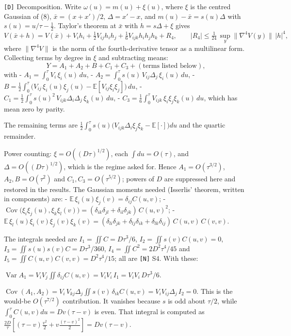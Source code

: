 \documentclass[11pt,a4paper]{article}
\begin{document}
\texttt{[D]} Decomposition. Write \(\omega(u)=m(u)+\xi(u)\), where \(\xi\) is the centred Gaussian of (8), \(\bar x=(x+x')/2\), \(\Delta=x'-x\), and \(m(u)-\bar x=s(u)\Delta\) with \(s(u)=u/\tau-\tfrac12\). Taylor's theorem at \(\bar x\) with \(h=s\Delta+\xi\) gives
\[V(\bar x+h)=V(\bar x)+V_ih_i+\tfrac12V_{ij}h_ih_j+\tfrac16V_{ijk}h_ih_jh_k+R_4,\qquad|R_4|\le\tfrac1{24}\,\sup_y\|\nabla^4V(y)\|\,|h|^4,\]
where \(\|\nabla^4V\|\) is the norm of the fourth-derivative tensor as a multilinear form. Collecting terms by degree in \(\xi\) and subtracting means:
\[Y=A_1+A_2+B+C_1+C_3+(\text{terms listed below}),\]
with
- \(A_1=\int_0^\tau V_i\,\xi_i(u)\,du\),
- \(A_2=\int_0^\tau s(u)\,V_{ij}\Delta_j\,\xi_i(u)\,du\),
- \(B=\tfrac12\int_0^\tau\big(V_{ij}\,\xi_i(u)\xi_j(u)-\mathbb E[V_{ij}\xi_i\xi_j]\big)\,du\),
- \(C_1=\tfrac12\int_0^\tau s(u)^2\,V_{ijk}\Delta_i\Delta_j\,\xi_k(u)\,du\),
- \(C_3=\tfrac16\int_0^\tau V_{ijk}\,\xi_i\xi_j\xi_k(u)\,du\), which has mean zero by parity.

The remaining terms are \(\tfrac12\int_0^\tau s(u)\big(V_{ijk}\Delta_i\xi_j\xi_k-\mathbb E[\cdot]\big)du\) and the quartic remainder.

Power counting: \(\xi=O((D\tau)^{1/2})\), each \(\int du=O(\tau)\), and \(\Delta=O((D\tau)^{1/2})\), which is the regime asked for. Hence \(A_1=O(\tau^{3/2})\), \(A_2,B=O(\tau^2)\) and \(C_1,C_3=O(\tau^{5/2})\); powers of \(D\) are suppressed here and restored in the results. The Gaussian moments needed (Isserlis' theorem, written in components) are:
- \(\mathbb E\,\xi_i(u)\xi_j(v)=\delta_{ij}C(u,v)\);
- \(\operatorname{Cov}\big(\xi_i\xi_j(u),\xi_k\xi_l(v)\big)=(\delta_{ik}\delta_{jl}+\delta_{il}\delta_{jk})\,C(u,v)^2\);
- \(\mathbb E\,\xi_l(u)\xi_i(v)\xi_j(v)\xi_k(v)=(\delta_{li}\delta_{jk}+\delta_{lj}\delta_{ik}+\delta_{lk}\delta_{ij})\,C(u,v)\,C(v,v)\).

The integrals needed are \(I_1=\iint C=D\tau^3/6\), \(I_2=\iint s(v)C(u,v)=0\), \(I_3=\iint s(u)s(v)C=D\tau^3/360\), \(I_4=\iint C^2=2D^2\tau^4/45\) and \(I_5=\iint C(u,v)C(v,v)=D^2\tau^4/15\); all are \texttt{[N]} S4. With these:

\(\operatorname{Var}A_1=V_iV_j\iint\delta_{ij}C(u,v)=V_iV_i\,I_1=V_iV_i\,D\tau^3/6\).

\(\operatorname{Cov}(A_1,A_2)=V_i\,V_{kj}\Delta_j\iint s(v)\,\delta_{ik}C(u,v)=V_iV_{ij}\Delta_j\,I_2=0\). This is the would-be \(O(\tau^{7/2})\) contribution. It vanishes because \(s\) is odd about \(\tau/2\), while \(\int_0^\tau C(u,v)du=Dv(\tau-v)\) is even. That integral is computed as \(\frac{2D}\tau[(\tau-v)\frac{v^2}2+v\frac{(\tau-v)^2}2]=Dv(\tau-v)\).
\end{document}
